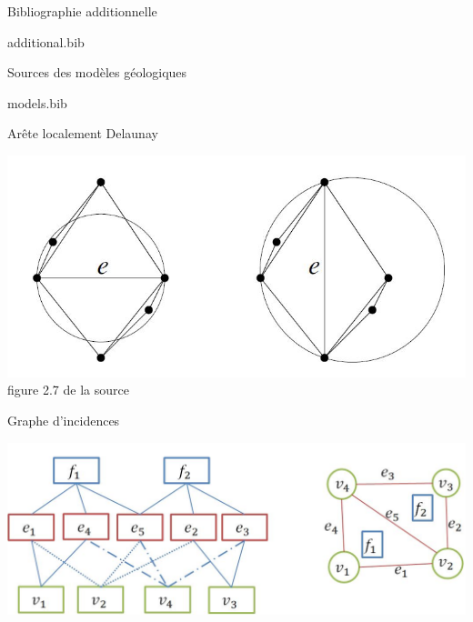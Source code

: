 \documentclass[aspectratio=169, 12pt, a4paper, hyperref={pdfauthor={Alexandre MARIN}, pdfkeywords={IFPEN, Delaunay, Voronoi, mesh generation}, colorlinks=true, linkcolor=purple, urlcolor=blue, citecolor=magenta}]{beamer}
\begin{document}
\makeByeSlide

\begin{Energie}{\small Bibliographie additionnelle}

{\tiny
\begin{btSect}{additional.bib}
\btPrintNotCited
\end{btSect}}
\end{Energie}

\begin{Energie}{\small Sources des modèles géologiques}

{\fontsize{10}{12}\selectfont
\begin{btSect}{models.bib}
\btPrintNotCited
\btPrintCited
\end{btSect}}
\end{Energie}



\begin{Energie}{Arête localement Delaunay}
\begin{center}
\includegraphics[scale=0.6]{locDel.jpg}
\\figure 2.7 de la source \cite{delnotes}
\end{center}
\end{Energie}

\begin{Energie}{Graphe d'incidences}
\begin{center}
\includegraphics[scale=0.65]{adjacencies.jpg}
\end{center}
\end{Energie}
\end{document}
